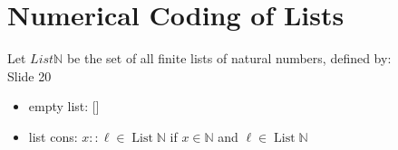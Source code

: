 \documentclass[10pt]{article}
\begin{document}



\section*{Numerical Coding of Lists}
Let $L i s t \mathbb{N}$ be the set of all finite lists of natural numbers, defined by:\\
Slide 20

\begin{itemize}
  \item empty list: []
  \item list cons: $x:: \ell \in \operatorname{List} \mathbb{N}$ if $x \in \mathbb{N}$ and $\ell \in \operatorname{List} \mathbb{N}$
\end{itemize}
\end{document}

